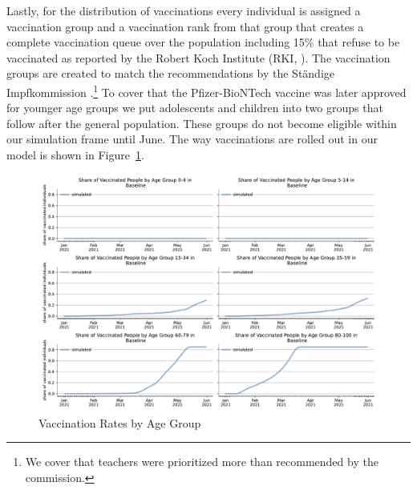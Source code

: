 Lastly, for the distribution of vaccinations every individual is assigned a vaccination
group and a vaccination rank from that group that creates a complete vaccination queue
over the population including 15\% that refuse to be vaccinated as reported by the
Robert Koch Institute (RKI, \cite{RKI2021c}). The vaccination groups are created to
match the recommendations by the Ständige Impfkommission
\citep{VygenBonnet2020}.\footnote{We cover that teachers were prioritized more than
recommended by the commission.} To cover that the Pfizer-BioNTech vaccine was later
approved for younger age groups we put adolescents and children into two groups that
follow after the general population. These groups do not become eligible within our
simulation frame until June. The way vaccinations are rolled out in our model is shown
in Figure~\ref{fig:vaccinations_by_age_group}.

\begin{figure}[ht]   %
  \centering
  \includegraphics[width=\textwidth]{figures/results/figures/vaccinations/spring_baseline}
  \caption{Vaccination Rates by Age Group}
  \label{fig:vaccinations_by_age_group}
\end{figure}

\FloatBarrier
